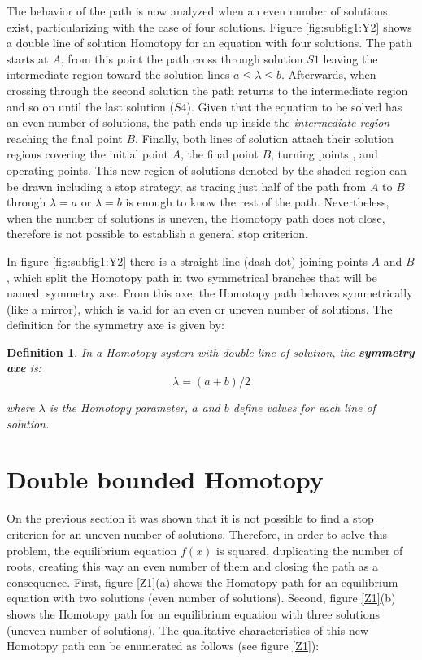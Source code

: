 \documentclass[conference,letterpaper,onecolumn]{IEEEtran}
\newtheorem{Theod}{{\bf Definition}}
\begin{document}
The behavior of the path is now analyzed when an even number of solutions exist, particularizing with the case of four solutions. Figure \ref{fig:subfig1:Y2} shows a double line of solution Homotopy for an equation with four solutions. The path starts at $A$, from this point the path cross through solution $S1$ leaving the intermediate region toward the solution lines $a \leq \lambda \leq b $. Afterwards, when crossing through the second solution the path returns to the intermediate region and so on until the last solution ($S4$). Given that the equation to be solved has an even number of solutions, the path ends up inside the {\it intermediate region} reaching the final point $B$. Finally, both lines of solution attach their solution regions covering the initial point $A$, the final point $B$, turning points , and operating points. This new region of solutions denoted by the shaded region can be drawn including a stop strategy, as tracing just half of the path from $A$ to $B$ through $\lambda=a$ or $\lambda=b$ is enough to know the rest of the path. Nevertheless, when the number of solutions is uneven, the Homotopy path does not close, therefore is not possible to establish a general stop criterion.

In figure \ref{fig:subfig1:Y2} there is a straight line (dash-dot) joining points $A$ and $B$, which split the Homotopy path in two symmetrical branches that will be named: symmetry axe. From this axe, the Homotopy path behaves symmetrically (like a mirror), which is valid for an even or uneven number of solutions. The definition for the symmetry axe is given by:

\begin{Theod}
In a Homotopy system with double line of solution, the {\bf symmetry axe} is:
\begin{displaymath}
\lambda=(a+b)/2
\end{displaymath}

where $\lambda$ is the Homotopy parameter, $a$ and $b$ define values for each line of solution.
\label{InestCondh2}
\end{Theod}

\section{Double bounded Homotopy}

On the previous section it was shown that it is not possible to find a stop criterion for an uneven number of solutions. Therefore, in order to solve this problem, the equilibrium equation $f(x)$ is squared, duplicating the number of roots, creating this way an even number of them and closing the path as a consequence. First, figure \ref{Z1}(a) shows the Homotopy path for an equilibrium  equation with two solutions (even number of solutions). Second, figure \ref{Z1}(b) shows the Homotopy path for an equilibrium equation with three solutions (uneven number of solutions). The qualitative characteristics of this new Homotopy path can be enumerated as follows (see figure \ref{Z1}):
\end{document}
